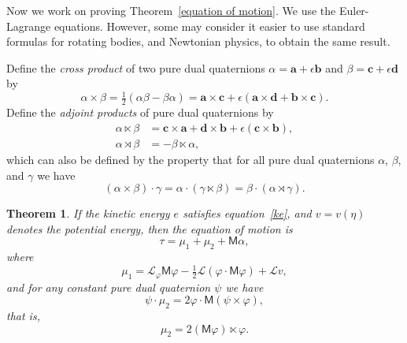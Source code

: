 \documentclass[reqno,12pt]{amsart}
\newcommand{\liederiv}{\mathcal L}
\newtheorem{theorem}{Theorem}
\begin{document}
\bigskip

Now we work on proving Theorem~\ref{equation of motion}.  We use the Euler-Lagrange equations.  However, some may consider it easier to use standard formulas for rotating bodies, and Newtonian physics, to obtain the same result.

Define the \emph{cross product} of two pure dual quaternions $\alpha = \bm a + \epsilon \bm b$ and $\beta = \bm c + \epsilon \bm d$ by
\begin{equation}
\alpha \times \beta = \tfrac12(\alpha \beta - \beta \alpha) = \bm a \times \bm c + \epsilon (\bm a \times \bm d + \bm b \times \bm c) .
\end{equation}
Define the \emph{adjoint products} of pure dual quaternions by
\begin{align}
\label{ltimes}
\alpha \ltimes \beta &= \bm c \times \bm a + \bm d \times \bm b + \epsilon (\bm c \times \bm b) ,\\
\alpha \rtimes \beta &= - \beta \ltimes \alpha ,
\end{align}
which can also be defined by the property that for all pure dual quaternions $\alpha$, $\beta$, and $\gamma$ we have
\begin{equation}
(\alpha \times \beta) \cdot \gamma = \alpha \cdot (\gamma \ltimes \beta) = \beta \cdot (\alpha \rtimes \gamma ).
\end{equation}


\begin{theorem}
\label{euler-lagrange}
If the kinetic energy $e$ satisfies equation~\eqref{ke}, and $v = v(\eta)$ denotes the potential energy, then the equation of motion is
\begin{equation}
\label{tau M gamma}
\tau = \mu_1 + \mu_2 + \mathsf M \alpha,
\end{equation}
where
\begin{equation}
\mu_1 = \liederiv_\varphi \mathsf M \varphi - \tfrac12 \liederiv(\varphi \cdot \mathsf M \varphi) + \liederiv v, 
\end{equation}
and for any constant pure dual quaternion $\psi$ we have
\begin{equation}
\psi \cdot \mu_2 = 2 \varphi \cdot \mathsf M (\psi \times \varphi),
\end{equation}
that is,
\begin{equation}
\label{formula mu_2}
\mu_2 = 2 (\mathsf M \varphi) \ltimes \varphi .
\end{equation}
\end{theorem}
\end{document}
